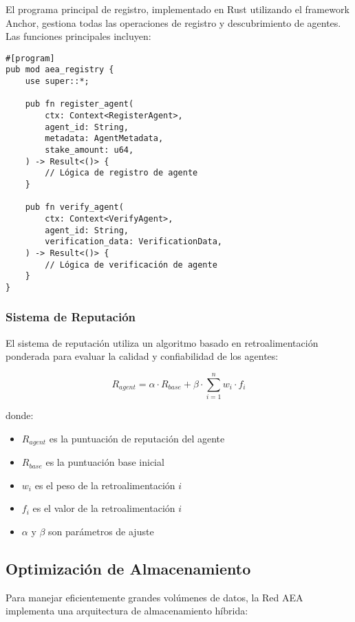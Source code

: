 \documentclass[12pt,a4paper]{article}
\begin{document}
El programa principal de registro, implementado en Rust utilizando el framework Anchor, gestiona todas las operaciones de registro y descubrimiento de agentes. Las funciones principales incluyen:

\begin{verbatim}
#[program]
pub mod aea_registry {
    use super::*;
    
    pub fn register_agent(
        ctx: Context<RegisterAgent>,
        agent_id: String,
        metadata: AgentMetadata,
        stake_amount: u64,
    ) -> Result<()> {
        // Lógica de registro de agente
    }
    
    pub fn verify_agent(
        ctx: Context<VerifyAgent>,
        agent_id: String,
        verification_data: VerificationData,
    ) -> Result<()> {
        // Lógica de verificación de agente
    }
}
\end{verbatim}

\subsubsection{Sistema de Reputación}

El sistema de reputación utiliza un algoritmo basado en retroalimentación ponderada para evaluar la calidad y confiabilidad de los agentes:

\begin{equation}
R_{agent} = \alpha \cdot R_{base} + \beta \cdot \sum_{i=1}^{n} w_i \cdot f_i
\end{equation}

donde:
\begin{itemize}
\item $R_{agent}$ es la puntuación de reputación del agente
\item $R_{base}$ es la puntuación base inicial
\item $w_i$ es el peso de la retroalimentación $i$
\item $f_i$ es el valor de la retroalimentación $i$
\item $\alpha$ y $\beta$ son parámetros de ajuste
\end{itemize}

\subsection{Optimización de Almacenamiento}

Para manejar eficientemente grandes volúmenes de datos, la Red AEA implementa una arquitectura de almacenamiento híbrida:
\end{document}
